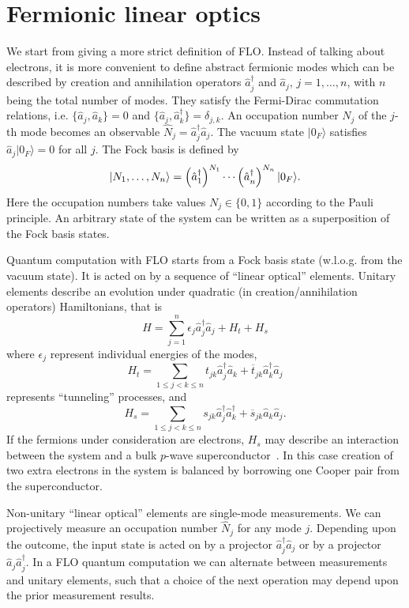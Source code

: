 \documentclass[twocolumn,showpacs,preprintnumbers,superscriptaddress]{revtex4}
\newcommand{\ra}{\rangle}
\newcommand{\ep}{\epsilon}
\newcommand{\be}{\begin{equation}}
\newcommand{\ee}{\end{equation}}
\newcommand{\aop}{{\hat{a}}}
\newcommand{\nop}{{\hat{N}}}
\begin{document}
\section{Fermionic linear optics}\label{sec:FLO}

We start from giving a more strict definition of FLO. Instead of talking
about electrons, it is more convenient to define abstract fermionic modes
which can be described by creation and annihilation operators
$\aop_j^\dag$ and  $\aop_j$, $j=1,\ldots, n$, with $n$ being the total number of
modes. They satisfy the Fermi-Dirac
commutation relations, i.e. $\{\aop_j,\aop_k\}=0$ and $\{\aop_j,\aop_k^\dag\}=\delta_{j,k}$.
An occupation number $N_j$ of the $j$-th mode 
becomes an observable $\nop_j=\aop_j^\dag \aop_j$. The vacuum state $|0_F\ra$
satisfies $\aop_j |0_F\ra=0$ for all $j$. The Fock basis is defined by
\[
|N_1,\ldots,N_n\ra = \left( \aop_1^\dag \right)^{N_1}\cdots
 \left( \aop_{\mathstrut n}^{\dag} \right)^{N_n} |0_F\ra.
\]
Here the occupation numbers take values $N_j\in \{0,1\}$ according to the 
Pauli principle. An arbitrary state of the system can be written as a 
superposition of the Fock basis states.

Quantum computation with FLO starts from a Fock basis state
(w.l.o.g. from the vacuum state). It is acted on by
a sequence of ``linear optical'' elements. Unitary elements describe an evolution under
quadratic (in creation/annihilation operators)  Hamiltonians, that is 
\be\label{H_FLO}
H=\sum_{j=1}^n \ep_j \aop_j^\dag \aop_j + H_t + H_s
\ee
where $\ep_j$ represent individual energies of the modes,
\[
H_t = \sum_{1\le j< k \le n} 
t_{jk} \aop_j^\dag \aop_k + \overline{t}_{jk} \aop_k^\dag \aop_j
\]
represents ``tunneling'' processes, and
\[
H_s = \sum_{1\le j< k \le n} 
s_{jk} \aop_j^\dag \aop_k^\dag + \overline{s}_{jk} \aop_k \aop_j.
\]
If the fermions under consideration are electrons, $H_s$ 
may describe an interaction between the system and a bulk $p$-wave superconductor~\cite{Kitaev}.
In this case creation of two extra electrons in the system is balanced by borrowing one
Cooper pair from the superconductor.

Non-unitary ``linear optical'' elements are single-mode measurements. We can
projectively measure an occupation number  $\nop_j$ for any mode $j$.
Depending upon the outcome, the input state is acted on by a projector $\aop_j^\dag \aop_j$ 
or by a projector $\aop_j \aop_j^\dag$. 
In a FLO quantum computation we can alternate between 
measurements and unitary elements, such that   
a choice of the next operation may depend upon the prior  
measurement results.
\end{document}
